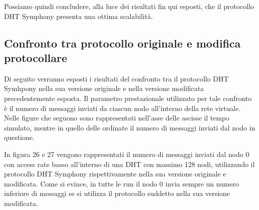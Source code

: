 \documentclass[	
	DIV=calc,
	paper=a4,
	fontsize=11pt,
	onecolumn
]{scrartcl} %
\begin{document}
	Possiamo quindi concludere, alla luce dei risultati fin qui esposti, che il protocollo DHT Symphony presenta una ottima scalabilità.
	
	\subsection{Confronto tra protocollo originale e modifica protocollare}
	Di seguito verranno esposti i risultati del confronto tra il protocollo DHT Symhpony nella sua versione originale e nella versione modificata precedentemente esposta. Il parametro prestazionale utilizzato per tale confronto è il numero di messaggi inviati da ciascun nodo all'interno della rete virtuale.
Nelle figure che seguono sono rappresentati nell'asse delle ascisse il tempo simulato, mentre in quello delle ordinate il numero di messaggi inviati dal nodo in questione.
	
	In figura 26 e 27 vengono rappresentati il numero di messaggi inviati dal nodo 0 con access rate basso all'interno di una DHT con massimo 128 nodi, utilizzando il protocollo DHT Symphony rispettivamente nella sua versione originale e modificata. Come si evince, in tutte le run il nodo 0 invia sempre un numero inferiore di messaggi se si utilizza il protocollo suddetto nella sua versione modificata.
	
\end{document}
